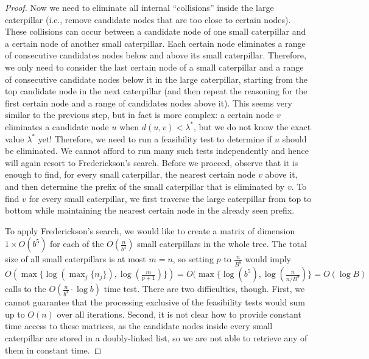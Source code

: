 \documentclass[11pt,a4paper]{article}
\theoremstyle{definition}
\theoremstyle{remark}
\begin{document}
\begin{proof}
Now we need to eliminate all internal ``collisions'' inside the large caterpillar (i.e., remove candidate nodes that
are too close to certain nodes). These collisions can occur between a candidate node of one small caterpillar
and a certain node of another small caterpillar. Each certain node eliminates a range of consecutive
candidates nodes below and above its small caterpillar. Therefore, we only need to consider the 
last certain node of a small caterpillar and a range of consecutive candidate nodes below it in the
large caterpillar, starting from the top candidate node in the next caterpillar (and then repeat
the reasoning for the first certain node and a range of candidates nodes above it). This seems very similar
to the previous step, but in fact is more complex: a certain node $v$ eliminates a candidate node $u$ when
$d(u,v)<\lambda^{*}$, but we do not know the exact value $\lambda^{*}$ yet! Therefore, we need to run
a feasibility test to determine if $u$ should be eliminated. We cannot afford to run many such tests
independently and hence will again resort to Frederickson's search. Before we proceed, observe that
it is enough to find, for every small caterpillar, the nearest certain node $v$ above it, and then determine
the prefix of the small caterpillar that is eliminated by $v$. To find $v$ for every small caterpillar,
we first traverse the large caterpillar from top to bottom while maintaining the nearest certain node
in the already seen prefix.

To apply Frederickson's search, we would like to create a matrix of dimension $1\times O(b^{5})$
for each of the $O(\frac{n}{b^{4}})$ small caterpillars in the whole tree. The total size of all small
caterpillars is at most $m=n$, so setting $p$ to $\frac{n}{B^9}$ would imply
$O(\max \lbrace \log(\max_{j} \lbrace n_j \rbrace), \log(\frac{m}{p+1}) \rbrace) = O(\max \lbrace \log (b^{5}), \log(\frac{n}{n/B^{9}}) \rbrace = O(\log B)$ calls to the $O(\frac{n}{b^{4}} \cdot \log b)$ time test.
There are two difficulties, though. First, we cannot guarantee that the processing exclusive of the feasibility tests
would sum up to $O(n)$ over all iterations. Second, it is not clear how to provide constant time access
to these matrices, as the candidate nodes inside every small caterpillar are stored in a doubly-linked list,
so we are not able to retrieve any of them in constant time. 


\end{proof}
\end{document}

